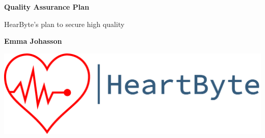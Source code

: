 \begin{titlepage}
   \begin{center}
       \vspace*{1cm}
        \Huge
       \textbf{Quality Assurance Plan}
        
        \Large
       \vspace{0.5cm}
        HearByte's plan to secure high quality 
            
       \vspace{1.5cm}

       \textbf{Emma Johasson}

       \vfill
            
     
     \date{October 2020}

            
      \vfill
\includegraphics[width=\linewidth]{Pictures/logo_heartbyte_transparent_v_1_1 (1)}

    \vfill
            
   \end{center}
\end{titlepage}
